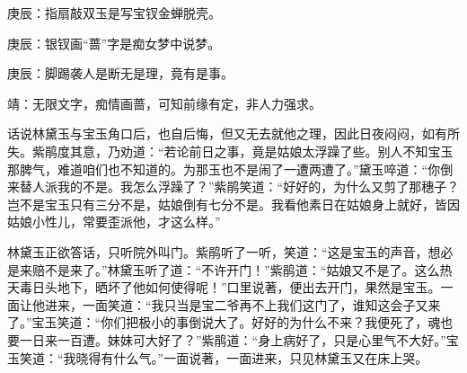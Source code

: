 \begin{parag}

    \begin{note}庚辰：指扇敲双玉是写宝钗金蝉脱壳。\end{note}
\end{parag}


\begin{parag}


    \begin{note}庚辰：银钗画“蔷”字是痴女梦中说梦。\end{note}
\end{parag}


\begin{parag}


    \begin{note}庚辰：脚踢袭人是断无是理，竟有是事。\end{note}
\end{parag}


\begin{parag}


    \begin{note}靖：无限文字，痴情画蔷，可知前缘有定，非人力强求。\end{note}
\end{parag}

\begin{parag}

    话说林黛玉与宝玉角口后，也自后悔，但又无去就他之理，因此日夜闷闷，如有所失。紫鹃度其意，乃劝道：“若论前日之事，竟是姑娘太浮躁了些。别人不知宝玉那脾气，难道咱们也不知道的。为那玉也不是闹了一遭两遭了。”黛玉啐道：“你倒来替人派我的不是。我怎么浮躁了？”紫鹃笑道：“好好的，为什么又剪了那穗子？岂不是宝玉只有三分不是，姑娘倒有七分不是。我看他素日在姑娘身上就好，皆因姑娘小性儿，常要歪派他，才这么样。”
\end{parag}


\begin{parag}


    林黛玉正欲答话，只听院外叫门。紫鹃听了一听，笑道：“这是宝玉的声音，想必是来赔不是来了。”林黛玉听了道：“不许开门！”紫鹃道：“姑娘又不是了。这么热天毒日头地下，晒坏了他如何使得呢！”口里说著，便出去开门，果然是宝玉。一面让他进来，一面笑道：“我只当是宝二爷再不上我们这门了，谁知这会子又来了。”宝玉笑道：“你们把极小的事倒说大了。好好的为什么不来？我便死了，魂也要一日来一百遭。妹妹可大好了？”紫鹃道：“身上病好了，只是心里气不大好。”宝玉笑道：“我晓得有什么气。”一面说著，一面进来，只见林黛玉又在床上哭。
\end{parag}


